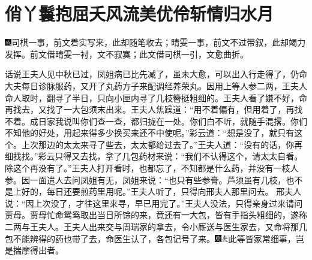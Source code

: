 
\chapter{俏丫鬟抱屈夭风流\hspace{.5em}美优伶斩情归水月}

{\includegraphics[width=3mm]{../Images/00005}\kaishu 司棋一事，前文着实写来，此却随笔收去；晴雯一事，前文不过带叙，此却竭力发挥。前文借晴雯一衬，文不寂寞；此文借司棋一引，文愈曲折。}

话说王夫人见中秋已过，凤姐病已比先减了，虽未大愈，可以出入行走得了，仍命大夫每日诊脉服药，又开了丸药方子来配调经养荣丸。因用上等人参二两，王夫人命人取时，翻寻了半日，只向小匣内寻了几枝簪挺粗细的。王夫人看了嫌不好，命再找去，又找了一大包须末出来。王夫人焦躁道：“用不着偏有，但用着了，再找不着。成日家我说叫你们查一查，都归拢在一处。你们白不听，就随手混撂。你们不知他的好处，用起来得多少换买来还不中使呢。”彩云道：“想是没了，就只有这个。上次那边的太太来寻了些去，太太都给过去了。”王夫人道：“没有的话，你再细找找。”彩云只得又去找，拿了几包药材来说：“我们不认得这个，请太太自看。除这个再没有了。”王夫人打开看时，也都忘了，不知都是什么药，并没有一枝人参。因一面遣人去问凤姐有无，凤姐来说：“也只有些参膏。芦须虽有几枝，也不是上好的，每日还要煎药里用呢。”王夫人听了，只得向邢夫人那里问去。
邢夫人说：“因上次没了，才往这里来寻，早已用完了。”王夫人没法，只得亲身过来请问贾母。贾母忙命鸳鸯取出当日所馀的来，竟还有一大包，皆有手指头粗细的，遂称二两与王夫人。王夫人出来交与周瑞家的拿去，令小厮送与医生家去，又命将那几包不能辨得的药也带了去，命医生认了，各包记号了来。{\includegraphics[width=3mm]{../Images/00004}\includegraphics[width=3mm]{../Images/00012}\footnotesize \kaishu 此等皆家常细事，岂是揣摩得出者。}

